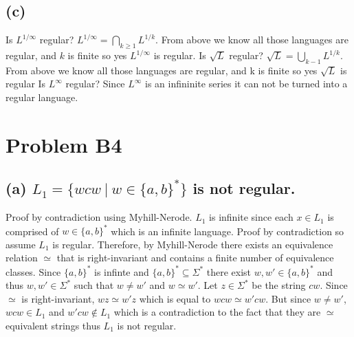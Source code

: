 \documentclass[12pt]{article}
\begin{document}
\subsection*{(c)}
Is $L^{1/\infty}$ regular? $L^{1/\infty} = \bigcap_{k\ge1}L^{1/k}$.
From above we know all those languages are regular, and $k$ is finite so
yes $L^{1/\infty}$ is regular.
\newline
Is $\sqrt{L}$ regular? $\sqrt{L} = \bigcup_{k-1}L^{1/k}$.
From above we know all those languages are regular,
and k is finite so yes $\sqrt{L}$ is regular
\newline
Is $L^{\infty}$ regular? Since $L^{\infty}$ is an infininite series it can not be turned into a regular language.
\newpage
\section*{Problem B4}
\subsection*{(a) $L_1 = \{wcw\ |\ w \in \{a,b\}^*\}$
\textnormal {is} not \textnormal{regular.}}
Proof by contradiction using Myhill-Nerode. $L_1$ is infinite since
each $x \in L_1$ is comprised of $w \in \{a,b\}^*$ which is an infinite
language. Proof by contradiction so assume $L_1$ is regular. Therefore, by
Myhill-Nerode there exists an equivalence relation $\simeq$ that is
right-invariant and contains a finite number of equivalence classes. Since
$\{a,b\}^*$ is infinte and $\{a,b\}^* \subseteq \Sigma^*$ there exist
$w,w' \in \{a,b\}^*$ and thus $w,w'\in \Sigma^*$ such that
$w \neq w'$ and $w \simeq w'$. Let $z \in \Sigma^*$ be the string $cw$.
Since $\simeq$ is right-invariant, $wz \simeq w'z$ which is
equal to $wcw \simeq w'cw$. But since $w \neq w'$, $wcw \in L_1$
and $w'cw \notin L_1$ which is a contradiction to the fact that they are
$\simeq$ equivalent strings thus $L_1$ is not regular.
\end{document}
